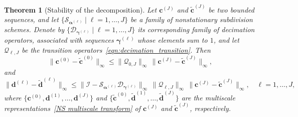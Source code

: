 \documentclass[11pt,a4paper]{article}
\newtheorem{theorem}{Theorem}[section]
\theoremstyle{definition}
\begin{document}
\begin{theorem}[Stability of the decomposition]
\label{thm. stability of decomposition}
Let $\boldsymbol{c}^{(J)}$ and $\widetilde{\boldsymbol{c}}^{(J)}$ be two bounded sequences, and let $\{\mathcal{S}_{\boldsymbol{\alpha}^{(\ell)}} \mid \ell=1,\dots,J\}$ be a family of nonstationary subdivision schemes. Denote by $\{\mathcal{D}_{\boldsymbol{\gamma}^{(\ell)}} \mid \ell=1,\dots,J\}$ its corresponding family of decimation operators, associated with sequences $\boldsymbol{\gamma}^{(\ell)}$ whose elements sum to $1$, and let $\mathcal{Q}_{\ell,J}$ be the transition operators~\eqref{eqn:decimation_transition}. Then
\begin{equation}\label{eqn:decomposition_stability_1}
    \|\boldsymbol{c}^{(0)}-\widetilde{\boldsymbol{c}}^{(0)}\|_\infty \leq \|\mathcal{Q}_{0,J}\|_\infty \, \|\boldsymbol{c}^{(J)}-\widetilde{\boldsymbol{c}}^{(J)}\|_\infty,
\end{equation}
and
\begin{equation}\label{eqn:decomposition_stability_2}
    \|\boldsymbol{d}^{(\ell)}-\widetilde{\boldsymbol{d}}^{(\ell)}\|_\infty \leq \|\mathcal{I}-\mathcal{S}_{\boldsymbol{\alpha}^{(\ell)}}\mathcal{D}_{\boldsymbol{\gamma}^{(\ell)}}\|_\infty \, \|\mathcal{Q}_{\ell,J}\|_\infty \, \|\boldsymbol{c}^{(J)}-\widetilde{\boldsymbol{c}}^{(J)}\|_\infty, \quad \ell=1,\dots, J,
\end{equation}
where $\{\boldsymbol{c}^{(0)},\boldsymbol{d}^{(1)},\dots,\boldsymbol{d}^{(J)}\}$ and $\{\widetilde{\boldsymbol{c}}^{(0)},\widetilde{\boldsymbol{d}}^{(1)},\dots,\widetilde{\boldsymbol{d}}^{(J)}\}$ are the multiscale representations~\eqref{NS multiscale transform} of $\boldsymbol{c}^{(J)}$ and $\widetilde{\boldsymbol{c}}^{(J)}$, respectively.
\end{theorem}
\end{document}
